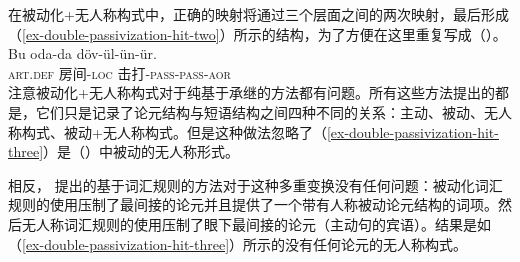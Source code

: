 \begin{exe}
\begin{xlist}[iv.]
\begin{exe}
\begin{xlist}[iv.]
\noindent
在被动化+无人称构式中，正确的映射将通过三个层面之间的两次映射，最后形成（\ref{ex-double-passivization-hit-two}）所示的结构，为了方便在这里重复写成（）。 
\ea
\label{ex-double-passivization-hit-three}
\gll Bu oda-da döv-ül-ün-ür.\\
     \textsc{art}.\textsc{def} 房间-\textsc{loc} 击打-\textsc{pass}-\textsc{pass}-\textsc{aor}\\
\z
注意被动化+无人称构式对于纯基于承继的方法都有问题。所有这些方法提出的都是，它们只是记录了论元结构与短语结构之间四种不同的关系：主动、被动、无人称构式、被动+无人称构式。但是这种做法忽略了（\ref{ex-double-passivization-hit-three}）是（）中被动的无人称形式。

相反， \citet{Mueller2003e}提出的基于词汇规则的方法对于这种多重变换没有任何问题：被动化词汇规则的使用压制了最间接的论元并且提供了一个带有人称被动论元结构的词项。然后无人称词汇规则的使用压制了眼下最间接的论元（主动句的宾语）。结果是如（\ref{ex-double-passivization-hit-three}）所示的没有任何论元的无人称构式。


\end{xlist}
\end{exe}
\end{xlist}
\end{exe}
